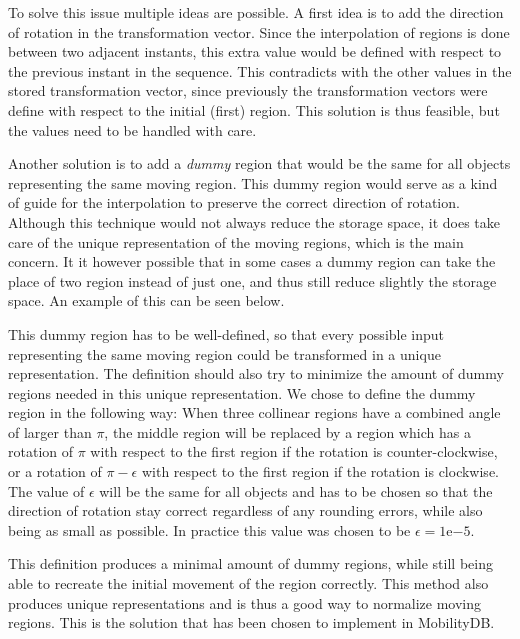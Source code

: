 
To solve this issue multiple ideas are possible. A first idea is to add the direction of rotation in the transformation vector. Since the interpolation of regions is done between two adjacent instants, this extra value would be defined with respect to the previous instant in the sequence. This contradicts with the other values in the stored transformation vector, since previously the transformation vectors were define with respect to the initial (first) region. This solution is thus feasible, but the values need to be handled with care.

Another solution is to add a \textit{dummy} region that would be the same for all objects representing the same moving region. This dummy region would serve as a kind of guide for the interpolation to preserve the correct direction of rotation. Although this technique would not always reduce the storage space, it does take care of the unique representation of the moving regions, which is the main concern. It it however possible that in some cases a dummy region can take the place of two region instead of just one, and thus still reduce slightly the storage space. An example of this can be seen below.


This dummy region has to be well-defined, so that every possible input representing the same moving region could be transformed in a unique representation. The definition should also try to minimize the amount of dummy regions needed in this unique representation. We chose to define the dummy region in the following way: When three collinear regions have a combined angle of larger than $\pi$, the middle region will be replaced by a region which has a rotation of $\pi$ with respect to the first region if the rotation is counter-clockwise, or a rotation of $\pi - \epsilon$ with respect to the first region if the rotation is clockwise. The value of $\epsilon$ will be the same for all objects and has to be chosen so that the direction of rotation stay correct regardless of any rounding errors, while also being as small as possible. In practice this value was chosen to be $\epsilon = 1\mathrm{e}{-5}$.

This definition produces a minimal amount of dummy regions, while still being able to recreate the initial movement of the region correctly. This method also produces unique representations and is thus a good way to normalize moving regions. This is the solution that has been chosen to implement in MobilityDB.

